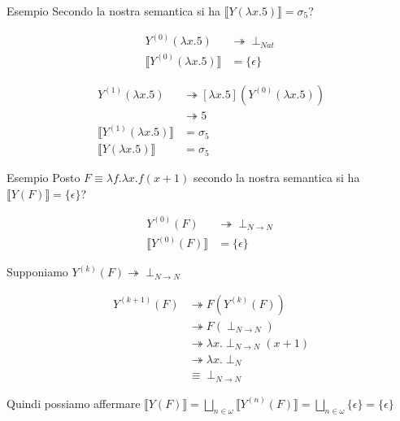 \documentclass{beamer}
\begin{document}
\begin{frame}

\begin{block}{Esempio}
	Secondo la nostra semantica si ha $\llbracket Y (\lambda x. 5) \rrbracket = \sigma_5$?
	
	\begin{align*}
		Y^{(0)}(\lambda x .5) & \twoheadrightarrow \perp_{Nat} \\
		\llbracket Y^{(0)}(\lambda x.5) \rrbracket & = \{ \epsilon \}
	\end{align*}
	
	\begin{align*}
		Y^{(1)}(\lambda x .5) & \twoheadrightarrow [\lambda x .5](Y^{(0)}(\lambda x .5)) \\
													& \twoheadrightarrow 5 \\
		\llbracket Y^{(1)}(\lambda x.5) \rrbracket & = \sigma_5 \\
		\llbracket Y(\lambda x.5) \rrbracket & = \sigma_5
	\end{align*}
	
	
\end{block}

\end{frame}




\begin{frame}


\begin{block}{Esempio}
	Posto $F \equiv \lambda f . \lambda x . f(x+1)$ secondo la nostra semantica si ha $\llbracket Y (F) \rrbracket = \{ \epsilon \}$?
	
	\begin{align*}
		Y^{(0)}(F) & \twoheadrightarrow \perp_{N \rightarrow N} \\
		\llbracket Y^{(0)}(F) \rrbracket & = \{ \epsilon \}
	\end{align*}
	
	Supponiamo $Y^{(k)}(F) \twoheadrightarrow \perp_{N \rightarrow N}$
	
	\begin{align*}
		Y^{(k+1)}(F) & \twoheadrightarrow F(Y^{(k)}(F)) \\
													& \twoheadrightarrow F(\perp_{N \rightarrow N}) \\
													& \twoheadrightarrow \lambda x.\perp_{N \rightarrow N}(x+1) \\
													& \twoheadrightarrow \lambda x.\perp_N \\
													& \equiv \perp_{N\rightarrow N}
		\end{align*}
	
	Quindi possiamo affermare $\llbracket Y(F) \rrbracket = \bigsqcup_{n\in \omega} \llbracket Y^{(n)}(F) \rrbracket = \bigsqcup_{n\in \omega} \{ \epsilon \} = \{ \epsilon \}$
	
\end{block}

\end{frame}
\end{document}
